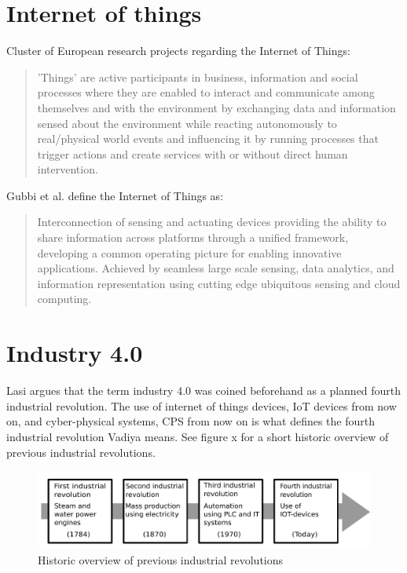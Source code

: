 \section{Internet of things}
Cluster of European research projects regarding the Internet of Things:
\begin{quote}
    'Things' are active participants in business, information and social processes where they are enabled to interact and communicate among themselves and with the environment by exchanging data and information sensed about the environment while reacting autonomously to real/physical world events and influencing it by running processes that trigger actions and create services with or without direct human intervention.\cite{Gubbi2013}
\end{quote} 

Gubbi et al. define the Internet of Things as:
\begin{quote}
    Interconnection of sensing and actuating devices providing the ability to share information across platforms through a unified framework, developing a common operating picture for enabling innovative applications. 
    Achieved by seamless large scale sensing, data analytics, and information representation using cutting edge ubiquitous sensing and cloud computing.\cite{Gubbi2013}
\end{quote}

\section{Industry 4.0}
Lasi argues that the term industry 4.0 was coined beforehand as a planned fourth industrial revolution.\cite{Lasi2014}
The use of internet of things devices, IoT devices from now on, and cyber-physical systems, CPS from now on is what defines the fourth industrial revolution Vadiya means.\cite{Vaidya2018}
See figure x for a short historic overview of previous industrial revolutions.   
\begin{figure}
    \centering
    \includegraphics[width=\textwidth]{Pictures/Industrial_revolution.pdf} 
    \caption{Historic overview of previous industrial revolutions}
    \label{Indutrial revolutions}
\end{figure}

